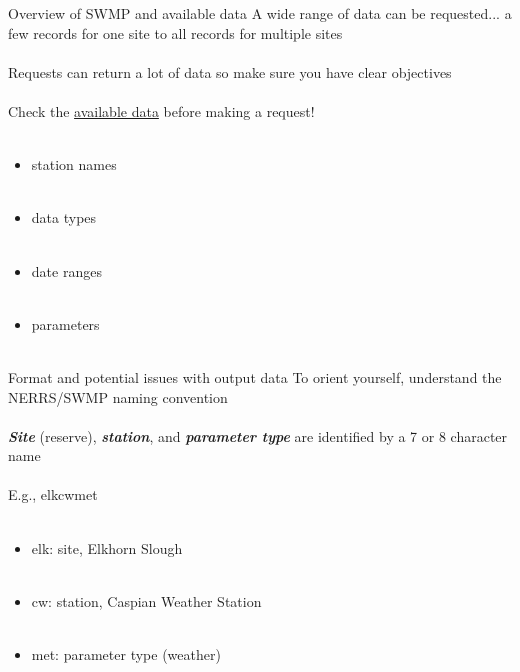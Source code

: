 \documentclass[xcolor=svgnames]{beamer}\usepackage[]{graphicx}\usepackage[]{color}
\newcommand{\Bigtxt}[1]{\textbf{\textit{#1}}}
\begin{document}
\begin{frame}{Overview of SWMP and available data}
A wide range of data can be requested... a few records for one site to all records for multiple sites \\~\\
Requests can return a lot of data so make sure you have clear objectives \\~\\
Check the \href{http://cdmo.baruch.sc.edu/data/availableOne.cfm}{available data} before making a request! \\~\\
\begin{itemize}
\item station names \\~\\
\item data types \\~\\
\item date ranges \\~\\
\item parameters \\~\\
\end{itemize}
\end{frame}

\begin{frame}{Format and potential issues with output data}
\onslide<+->
To orient yourself, understand the NERRS/SWMP naming convention\\~\\
\Bigtxt{Site} (reserve), \Bigtxt{station}, and \Bigtxt{parameter type} are identified by a 7 or 8 character name \\~\\
\onslide<+->
E.g., elkcwmet \\~\\
\onslide<+->
\begin{itemize}
\item elk: site, Elkhorn Slough \\~\\
\item cw: station, Caspian Weather Station \\~\\
\item met: parameter type (weather)
\end{itemize}
\end{frame}
\end{document}
